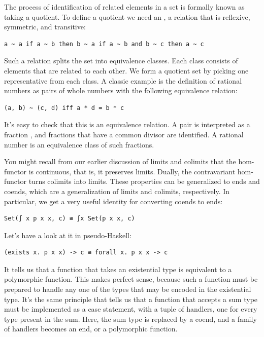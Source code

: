 The process of identification of related elements in a set is formally
known as taking a quotient. To define a quotient we need an
 \code{\textasciitilde{}}, a relation that
is reflexive, symmetric, and transitive:

\begin{verbatim}
a ~ a if a ~ b then b ~ a if a ~ b and b ~ c then a ~ c
\end{verbatim}

Such a relation splits the set into equivalence classes. Each class
consists of elements that are related to each other. We form a quotient
set by picking one representative from each class. A classic example is
the definition of rational numbers as pairs of whole numbers with the
following equivalence relation:

\begin{verbatim}
(a, b) ~ (c, d) iff a * d = b * c
\end{verbatim}

It's easy to check that this is an equivalence relation. A pair
 is interpreted as a fraction , and
fractions that have a common divisor are identified. A rational number
is an equivalence class of such fractions.

You might recall from our earlier discussion of limits and colimits that
the hom-functor is continuous, that is, it preserves limits. Dually, the
contravariant hom-functor turns colimits into limits. These properties
can be generalized to ends and coends, which are a generalization of
limits and colimits, respectively. In particular, we get a very useful
identity for converting coends to ends:

\begin{verbatim}
Set(∫ x p x x, c) ≅ ∫x Set(p x x, c)
\end{verbatim}

Let's have a look at it in pseudo-Haskell:

\begin{verbatim}
(exists x. p x x) -> c ≅ forall x. p x x -> c
\end{verbatim}

It tells us that a function that takes an existential type is equivalent
to a polymorphic function. This makes perfect sense, because such a
function must be prepared to handle any one of the types that may be
encoded in the existential type. It's the same principle that tells us
that a function that accepts a sum type must be implemented as a case
statement, with a tuple of handlers, one for every type present in the
sum. Here, the sum type is replaced by a coend, and a family of handlers
becomes an end, or a polymorphic function.

